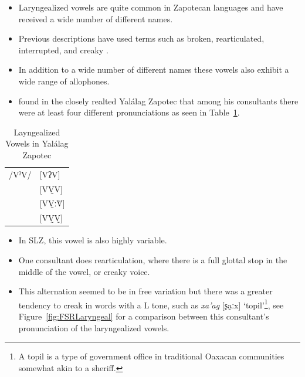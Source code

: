 \documentclass[12pt, letterpaper]{article}
\providecommand{\lsptoprule}{\midrule\toprule}
\providecommand{\lspbottomrule}{\bottomrule\midrule}
\begin{document}
\begin{itemize}
	\item Laryngealized vowels are quite common in Zapotecan languages and have received a wide number of different names. 
	\item Previous descriptions have used terms such as broken, rearticulated, interrupted, and creaky \citep{longDiccionarioZapotecoSan2005,avelinobecerraTopicsYalalagZapotec2004,avelinoAcousticElectroglottographicAnalyses2010,sonnenscheinDescriptiveGrammarSan2005,adlerAcousticsPhonationTypes2016,ariza-garciaPhonationTypesTones2018}.  
	\item In addition to a wide number of different names these vowels also exhibit a wide range of allophones.
	\item \citet{avelinoAcousticElectroglottographicAnalyses2010} found in the closely realted Yalálag Zapotec that among his consultants there were at least four different pronunciations as seen in Table~\ref{tab:laryngeal}. 
\end{itemize}

\begin{table}[!h]
	\centering
	\caption{Layngealized Vowels in Yalálag Zapotec}
	\label{tab:laryngeal}
	 \begin{tabular}{ll}
	\lsptoprule
	/VˀV/	&  [VʔV]  \\
			&  [VV̰V]   \\
			&  [VV̰ːV̆]  \\
			&  [VV̰V̰]	\\
	\lspbottomrule
	\end{tabular}
\end{table}

\begin{itemize}
	\item In SLZ, this vowel is also highly variable.
	\item One consultant does rearticulation, where there is a full glottal stop in the middle of the vowel, or creaky voice. 
	\item This alternation seemed to be in free variation but there was a greater tendency to creak in words with a L tone, such as \textit{xa'ag} [ʂa̰ːx] `topil'\footnote{A topil is a type of government office in traditional Oaxacan communities somewhat akin to a sheriff. }, see Figure~\ref{fig:FSRLaryngeal} for a comparison between this consultant's pronunciation of the laryngealized vowels.
\end{itemize}
\end{document}
